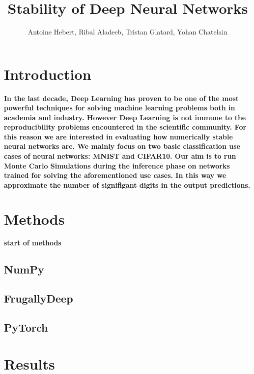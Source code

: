 \documentclass[a4paper,12pt]{article}
\begin{document}
\title{Stability of Deep Neural Networks}
\author{Antoine Hebert, Ribal Aladeeb, Tristan Glatard, Yohan Chatelain}
\maketitle
\section{Introduction}
\paragraph{In the last decade, Deep Learning has proven to be one of the most
	powerful techniques for solving machine learning problems both in academia
	and industry. However Deep Learning is not immune to the reproducibility
	problems encountered in the scientific community. For this reason we are
	interested in evaluating how numerically stable neural networks are. We
	mainly focus on two basic classification use cases of neural networks: MNIST
	and CIFAR10. Our aim is to run Monte Carlo Simulations during the inference phase
	on networks trained for solving the aforementioned use cases. In this way we approximate the number of signifigant digits in the output predictions.}
\section{Methods}

\paragraph{
    start of methods
}
\subsection{NumPy}
\subsection{FrugallyDeep}
\subsection{PyTorch}
\section{Results}
\end{document}
